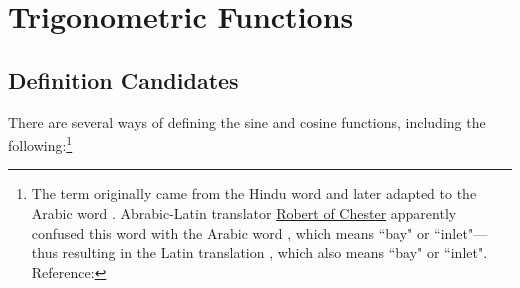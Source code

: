 
\chapter{Trigonometric Functions}

\section{Definition Candidates}

There are several ways of defining the sine and cosine functions, including the following:\footnote{
  The term  originally came from the Hindu word  and
  later adapted to the Arabic word .
  Abrabic-Latin translator
  \href{http://en.wikipedia.org/wiki/Robert_of_Chester}{Robert of Chester}
  apparently confused this word  with the Arabic word ,
  which means ``bay" or ``inlet"---
  thus resulting in the Latin translation , which also means ``bay" or ``inlet".
  Reference: %
  }

